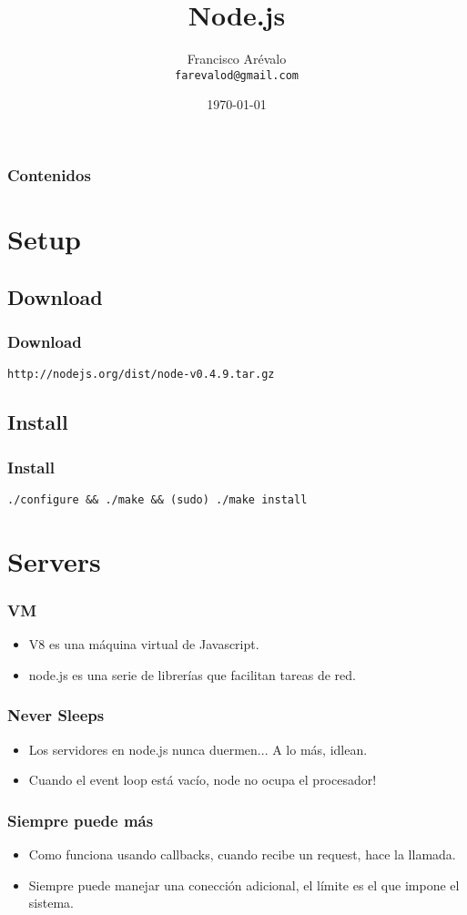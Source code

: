 \documentclass{beamer}
\title{Node.js}
\author{Francisco Ar\'evalo \\ \texttt{farevalod@gmail.com}}
\date{\today}
\begin{document}
\begin{frame}
\titlepage
\end{frame}
\begin{frame}
	\frametitle{Contenidos}
	\tableofcontents
\end{frame}
\section{Setup}
\subsection{Download}
\begin{frame}
\frametitle{Download}
\texttt{http://nodejs.org/dist/node-v0.4.9.tar.gz}
\end{frame}
\subsection{Install}
\begin{frame}
\frametitle{Install}
\texttt{./configure \&\& ./make \&\& (sudo) ./make install}
\end{frame}
\section{Servers}
\begin{frame}
\frametitle{VM}
\begin{itemize}
\item V8 es una m\'aquina virtual de Javascript.\\
\item node.js es una serie de librer\'ias que facilitan tareas de red.
\end{itemize}
\end{frame}
\begin{frame}
\frametitle{Never Sleeps}
\begin{itemize}
\item Los servidores en node.js nunca duermen... A lo m\'as, idlean.\\
\item Cuando el event loop est\'a vac\'io, node no ocupa el procesador!
\end{itemize}
\end{frame}
\begin{frame}
\frametitle{Siempre puede m\'as}
\begin{itemize}
\item Como funciona usando callbacks, cuando recibe un request, hace la llamada.\\
\item Siempre puede manejar una conecci\'on adicional, el l\'imite es el que impone el sistema.
\end{itemize}
\end{frame}
\end{document}
